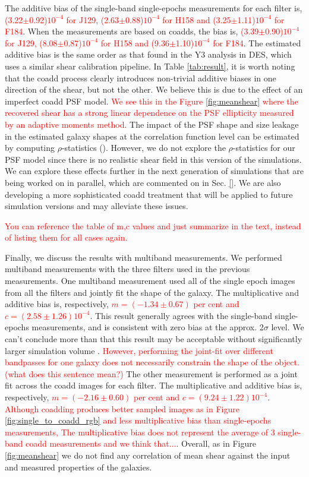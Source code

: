 \documentclass[fleqn,usenatbib]{mnras}
\begin{document}
The additive bias of the single-band single-epochs measurements for each filter is, \textcolor{red}{(3.22$\pm$0.92)$10^{-4}$ for J129, (2.63$\pm$0.88)$10^{-4}$ for H158 and (3.25$\pm$1.11)$10^{-4}$ for F184}. When the measurements are based on coadds, the bias is, \textcolor{red}{(3.39$\pm$0.90)$10^{-4}$ for J129, (8.08$\pm$0.87)$10^{-4}$ for H158 and (9.36$\pm$1.10)$10^{-4}$ for F184}. The estimated additive bias is the same order as that found in the Y3 analysis in DES, which uses a similar shear calibration pipeline. In Table \ref{tab:result}, it is worth noting that the coadd process clearly introduces non-trivial additive biases in one direction of the shear, but not the other. We believe this is due to the effect of an imperfect coadd PSF model. \textcolor{red}{We see this in the Figure \ref{fig:meanshear} where the recovered shear has a strong linear dependence on the PSF ellipticity measured by an adaptive moments method.} The impact of the PSF shape and size leakage in the estimated galaxy shapes at the correlation function level can be estimated by computing $\rho$-statistics (\citealt{2008A&A...484...67P, 2010MNRAS.404..350R, 2016MNRAS.460.2245J}). However, we do not explore the $\rho$-statistics for our PSF model since there is no realistic shear field in this version of the simulations. We can explore these effects further in the next generation of simulations that are being worked on in parallel, which are commented on in Sec. \ref{}. We are also developing a more sophisticated coadd treatment that will be applied to future simulation versions and may alleviate these issues.

\textcolor{red}{You can reference the table of m,c values and just summarize in the text, instead of listing them for all cases again.}

Finally, we discuss the results with multiband measurements. We performed multiband measurements with the three filters used in the previous measurements. One multiband measurement used all of the single epoch images from all the filters and jointly fit the shape of the galaxy. The multiplicative and additive bias is, respectively, \textcolor{red}{$m=(-1.34\pm0.67)$ per cent and $c=(2.58\pm1.26)10^{-4}$}. This result generally agrees with the single-band single-epochs measurements, and is consistent with zero bias at the approx. 2$\sigma$ level. We can't conclude more than that this result may be acceptable without significantly larger simulation volume .  \textcolor{red}{However, performing the joint-fit over different bandpasses for one galaxy does not necessarily constrain the shape of the object. (what does this sentence mean?)} The other measurement is performed as a joint fit across the coadd images for each filter. The multiplicative and additive bias is, respectively, \textcolor{red}{$m=(-2.16\pm0.60)$ per cent and $c=(9.24\pm1.22)10^{-4}$}. \textcolor{red}{Although coadding produces better sampled images as in Figure \ref{fig:single_to_coadd_rgb} and less multiplicative bias than single-epochs measurements, The multiplicative bias does not represent the average of 3 single-band coadd measurements and we think that...}. Overall, as in Figure \ref{fig:meanshear} we do not find any correlation of mean shear against the input and measured properties of the galaxies.
\end{document}
